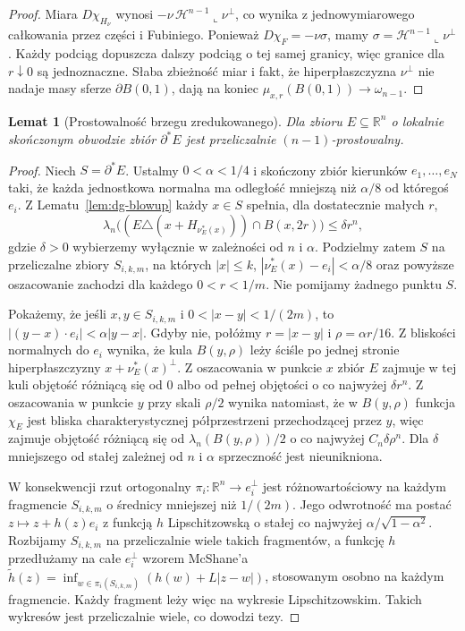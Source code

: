 \documentclass[11pt,a4paper,oneside]{book}
\numberwithin{equation}{chapter}
\theoremstyle{plain}
\newtheorem{lemat}[twierdzenie]{Lemat}
\theoremstyle{definition}
\theoremstyle{remark}
\begin{document}
\begin{proof}
Miara $D\chi_{H_\nu}$ wynosi
$-\nu\,\mathcal H^{n-1}\llcorner\nu^\perp$,
co wynika z jednowymiarowego całkowania
przez części i Fubiniego. Ponieważ
$D\chi_F=-\nu\sigma$, mamy
$\sigma=\mathcal H^{n-1}\llcorner\nu^\perp$.
Każdy podciąg dopuszcza dalszy podciąg o tej
samej granicy, więc granice dla $r\downarrow0$
są jednoznaczne. Słaba zbieżność miar i fakt,
że hiperpłaszczyzna $\nu^\perp$ nie nadaje masy
sferze $\partial B(0,1)$, dają na koniec
$\mu_{x,r}(B(0,1))\to\omega_{n-1}$.
\end{proof}

\begin{lemat}[Prostowalność brzegu zredukowanego]
\label{lem:dg-rectifiability}
Dla zbioru $E\subseteq\mathbb R^n$ o lokalnie
skończonym obwodzie zbiór $\partial^*E$ jest
przeliczalnie $(n-1)$-prostowalny.
\end{lemat}
\begin{proof}
Niech $S=\partial^*E$. Ustalmy $0<\alpha<1/4$
i skończony zbiór kierunków $e_1,\ldots,e_N$
taki, że każda jednostkowa normalna ma odległość
mniejszą niż $\alpha/8$ od któregoś $e_i$.
Z Lematu~\ref{lem:dg-blowup} każdy $x\in S$
spełnia, dla dostatecznie małych $r$,
\[
 \lambda_n\bigl((E\triangle(x+H_{\nu_E^*(x)}))
 \cap B(x,2r)\bigr)\le\delta r^n,
\]
gdzie $\delta>0$ wybierzemy wyłącznie w
zależności od $n$ i $\alpha$.
Podzielmy zatem $S$ na przeliczalne zbiory
$S_{i,k,m}$, na których $|x|\le k$,
$|\nu_E^*(x)-e_i|<\alpha/8$ oraz powyższe
oszacowanie zachodzi dla każdego $0<r<1/m$.
Nie pomijamy żadnego punktu $S$.

Pokażemy, że jeśli $x,y\in S_{i,k,m}$ i
$0<|x-y|<1/(2m)$, to
$|(y-x)\cdot e_i|<\alpha|y-x|$.
Gdyby nie, połóżmy $r=|x-y|$ i
$\rho=\alpha r/16$. Z bliskości normalnych
do $e_i$ wynika, że kula $B(y,\rho)$ leży
ściśle po jednej stronie hiperpłaszczyzny
$x+\nu_E^*(x)^\perp$. Z oszacowania w punkcie
$x$ zbiór $E$ zajmuje w tej kuli objętość
różniącą się od $0$ albo od pełnej objętości
o co najwyżej $\delta r^n$.
Z oszacowania w punkcie $y$ przy skali $\rho/2$
wynika natomiast, że w $B(y,\rho)$ funkcja
$\chi_E$ jest bliska charakterystycznej
półprzestrzeni przechodzącej przez $y$,
więc zajmuje objętość różniącą się od
$\lambda_n(B(y,\rho))/2$ o co najwyżej
$C_n\delta\rho^n$. Dla
$\delta$ mniejszego od stałej zależnej od
$n$ i $\alpha$ sprzeczność jest nieunikniona.

W konsekwencji rzut ortogonalny
$\pi_i:\mathbb R^n\to e_i^\perp$ jest
różnowartościowy na każdym fragmencie
$S_{i,k,m}$ o średnicy mniejszej niż $1/(2m)$.
Jego odwrotność ma postać
$z\mapsto z+h(z)e_i$ z funkcją $h$
Lipschitzowską o stałej co najwyżej
$\alpha/\sqrt{1-\alpha^2}$.
Rozbijamy $S_{i,k,m}$ na przeliczalnie wiele
takich fragmentów, a funkcję $h$ przedłużamy
na całe $e_i^\perp$ wzorem McShane'a
$\widetilde h(z)=\inf_{w\in\pi_i(S_{i,k,m})}
(h(w)+L|z-w|)$, stosowanym osobno na każdym
fragmencie. Każdy fragment leży więc na
wykresie Lipschitzowskim. Takich wykresów jest
przeliczalnie wiele, co dowodzi tezy.
\end{proof}
\end{document}
